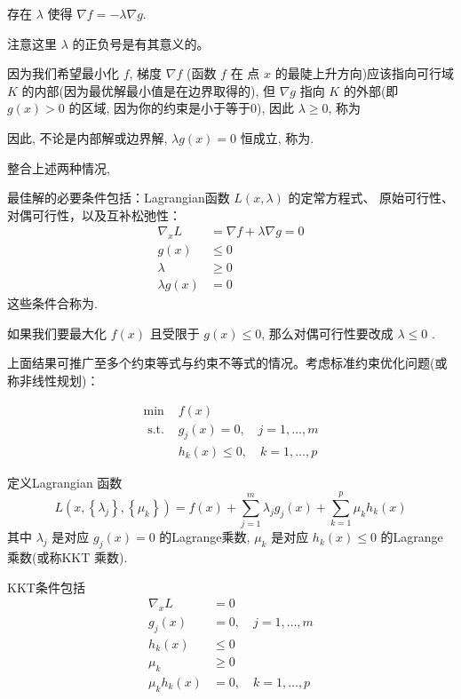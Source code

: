 \begin{corollary}
    存在 $\lambda$ 使得 $\nabla f=-\lambda \nabla g$.

    注意这里 $\lambda$ 的正负号是有其意义的。
\end{corollary}

因为我们希望最小化 $f$, 梯度 $\nabla f$ (函数 $f$ 在 点 ${x}$ 的最陡上升方向)应该指向可行域 $K$ 的内部(因为最优解最小值是在边界取得的), 但 $\nabla g$ 指向 $K$ 的外部(即 $g({x})>0$ 的区域, 因为你的约束是小于等于0), 因此 $\lambda \geq 0$, 称为

因此, 不论是内部解或边界解, $\lambda g({x})=0$ 恒成立, 称为.

整合上述两种情况, 

\begin{theorem}
    最佳解的必要条件包括：Lagrangian函数 $L({x}, \lambda)$ 的定常方程式、 原始可行性、对偶可行性，以及互补松弛性：
$$
\begin{aligned}
\nabla_{{x}} L &=\nabla f+\lambda \nabla g={0} \\
g({x}) & \leq 0 \\
\lambda & \geq 0 \\
\lambda g({x}) &=0
\end{aligned}
$$
这些条件合称为.

如果我们要最大化 $f({x})$ 且受限于 $g({x}) \leq 0$, 那么对偶可行性要改成 $\lambda \leq 0$ .
\end{theorem}


上面结果可推广至多个约束等式与约束不等式的情况。考虑标准约束优化问题(或称非线性规划)：

\begin{definition}
    $$
\begin{array}{ll}
\min & f({x}) \\
\text { s.t. } & g_{j}({x})=0, \quad j=1, \ldots, m \\
& h_{k}({x}) \leq 0, \quad k=1, \ldots, p
\end{array}
$$
\end{definition}

\begin{theorem}[标准约束优化的KKT条件]
    定义Lagrangian 函数
$$
L\left({x},\left\{\lambda_{j}\right\},\left\{\mu_{k}\right\}\right)=f({x})+\sum_{j=1}^{m} \lambda_{j} g_{j}({x})+\sum_{k=1}^{p} \mu_{k} h_{k}({x})
$$
其中 $ \lambda_{j} $ 是对应 $ g_{j}({x})=0 $ 的Lagrange乘数, $ \mu_{k} $ 是对应 $ h_{k}({x}) \leq 0 $ 的Lagrange乘数(或称KKT 乘数). 

KKT条件包括
$$
\begin{aligned}
\nabla_{{x}} L &={0} \\
g_{j}({x}) &=0, \quad j=1, \ldots, m \\
h_{k}({x}) & \leq 0 \\
\mu_{k} & \geq 0 \\
\mu_{k} h_{k}({x}) &=0, \quad k=1, \ldots, p
\end{aligned}
$$

\end{theorem}

